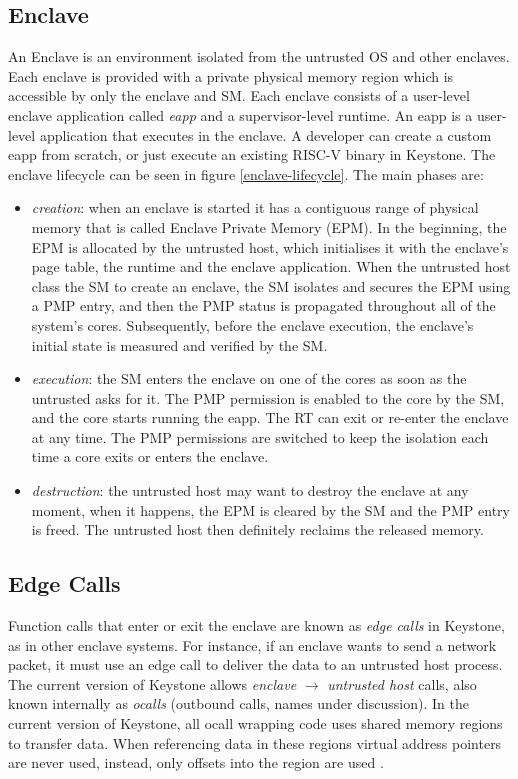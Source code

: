 \subsection{Enclave}
An Enclave is an environment isolated from the untrusted OS and other enclaves. Each enclave is provided with a private physical memory region which is accessible by only the enclave and SM. Each enclave consists of a user-level enclave application called \textit{eapp} and a supervisor-level runtime. An eapp is a user-level application that executes in the enclave. A developer can create a custom eapp from scratch, or just execute an existing RISC-V binary in Keystone. The enclave lifecycle can be seen in figure \ref{enclave-lifecycle}. The main phases are:
\begin{itemize}
    \item \textit{creation}: when an enclave is started it has a contiguous range of physical memory that is called Enclave Private Memory (EPM). In the beginning, the EPM is allocated by the untrusted host, which initialises it with the enclave's page table, the runtime and the enclave application. When the untrusted host class the SM to create an enclave, the SM isolates and secures the EPM using a PMP entry, and then the PMP status is propagated throughout all of the system's cores. Subsequently, before the enclave execution, the enclave's initial state is measured and verified by the SM.
    \item \textit{execution}: the SM enters the enclave on one of the cores as soon as the untrusted asks for it. The PMP permission is enabled to the core by the SM, and the core starts running the eapp. The RT can exit or re-enter the enclave at any time. The PMP permissions are switched to keep the isolation each time a core exits or enters the enclave.
    \item \textit{destruction}: the untrusted host may want to destroy the enclave at any moment, when it happens, the EPM is cleared by the SM and the PMP entry is freed. The untrusted host then definitely reclaims the released memory.
\end{itemize}

\subsection{Edge Calls}
Function calls that enter or exit the enclave are known as \textit{edge calls} in Keystone, as in other enclave systems. For instance, if an enclave wants to send a network packet, it must use an edge call to deliver the data to an untrusted host process. The current version of Keystone allows \textit{enclave} $\rightarrow$ \textit{untrusted host} calls, also known internally as \textit{ocalls} (outbound calls, names under discussion). In the current version of Keystone, all ocall wrapping code uses shared memory regions to transfer data. When referencing data in these regions virtual address pointers are never used, instead, only offsets into the region are used \cite{keystone-doc}. \\
 
